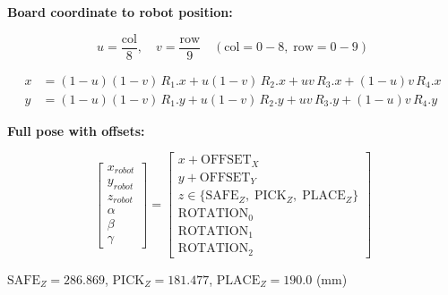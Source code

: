 \documentclass[border=10pt]{standalone}
\begin{document}
\textbf{Board coordinate to robot position:}

\[
u = \frac{\text{col}}{8}, \quad v = \frac{\text{row}}{9}
\quad (\text{col}=0\!-\!8,\; \text{row}=0\!-\!9)
\]

\[
\begin{aligned}
x &= (1-u)(1-v)\,R_1.x + u(1-v)\,R_2.x + uv\,R_3.x + (1-u)v\,R_4.x \\
y &= (1-u)(1-v)\,R_1.y + u(1-v)\,R_2.y + uv\,R_3.y + (1-u)v\,R_4.y
\end{aligned}
\]

\bigskip

\textbf{Full pose with offsets:}

\[
\begin{bmatrix} x_{robot} \\ y_{robot} \\ z_{robot} \\ \alpha \\ \beta \\ \gamma \end{bmatrix}
=
\begin{bmatrix}
x + \text{OFFSET}_X \\
y + \text{OFFSET}_Y \\
z \in \{\text{SAFE}_Z,\;\text{PICK}_Z,\;\text{PLACE}_Z\} \\
\text{ROTATION}_0 \\
\text{ROTATION}_1 \\
\text{ROTATION}_2
\end{bmatrix}
\]

\qquad
$\text{SAFE}_Z = 286.869$, $\text{PICK}_Z = 181.477$, $\text{PLACE}_Z = 190.0$ (mm)
\end{document}
